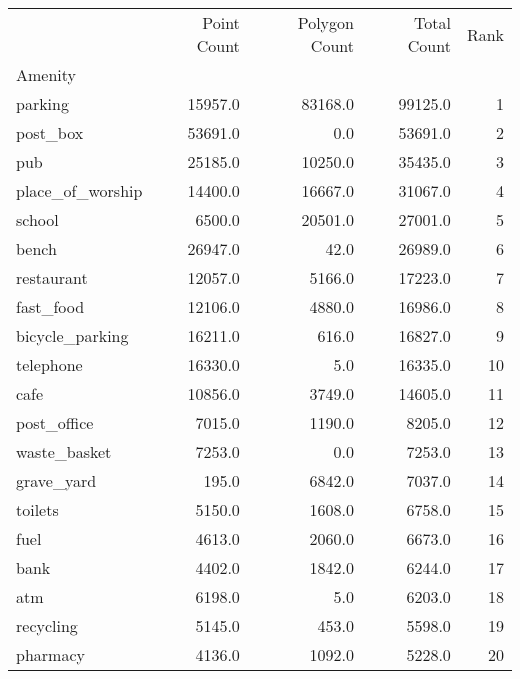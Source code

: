 \begin{tabular}{lrrrr}
\toprule
{} &  Point Count &  Polygon Count &  Total Count &  Rank \\
Amenity          &              &                &              &       \\
\midrule
parking          &      15957.0 &        83168.0 &      99125.0 &     1 \\
post\_box         &      53691.0 &            0.0 &      53691.0 &     2 \\
pub              &      25185.0 &        10250.0 &      35435.0 &     3 \\
place\_of\_worship &      14400.0 &        16667.0 &      31067.0 &     4 \\
school           &       6500.0 &        20501.0 &      27001.0 &     5 \\
bench            &      26947.0 &           42.0 &      26989.0 &     6 \\
restaurant       &      12057.0 &         5166.0 &      17223.0 &     7 \\
fast\_food        &      12106.0 &         4880.0 &      16986.0 &     8 \\
bicycle\_parking  &      16211.0 &          616.0 &      16827.0 &     9 \\
telephone        &      16330.0 &            5.0 &      16335.0 &    10 \\
cafe             &      10856.0 &         3749.0 &      14605.0 &    11 \\
post\_office      &       7015.0 &         1190.0 &       8205.0 &    12 \\
waste\_basket     &       7253.0 &            0.0 &       7253.0 &    13 \\
grave\_yard       &        195.0 &         6842.0 &       7037.0 &    14 \\
toilets          &       5150.0 &         1608.0 &       6758.0 &    15 \\
fuel             &       4613.0 &         2060.0 &       6673.0 &    16 \\
bank             &       4402.0 &         1842.0 &       6244.0 &    17 \\
atm              &       6198.0 &            5.0 &       6203.0 &    18 \\
recycling        &       5145.0 &          453.0 &       5598.0 &    19 \\
pharmacy         &       4136.0 &         1092.0 &       5228.0 &    20 \\

\end{tabular}
